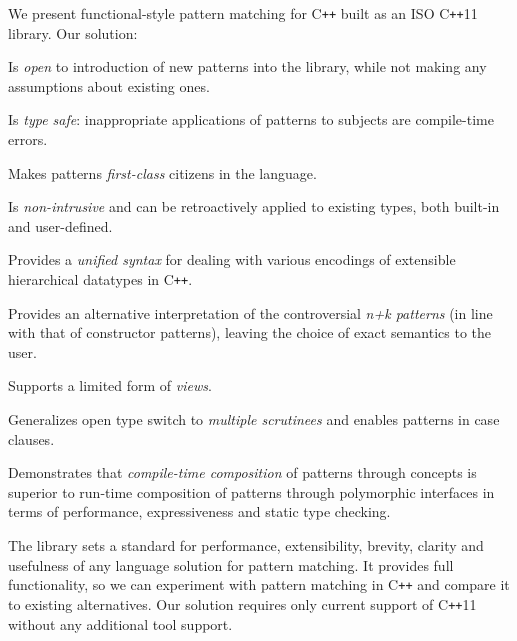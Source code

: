 \documentclass[10pt]{sigplanconf}
\DeclareRobustCommand{\Cpp}{C\texttt{++}}
\begin{document}
We present functional-style pattern matching for \Cpp{} built as an ISO 
\Cpp{}11 library. Our solution:

\begin{compactitem}
\setlength{\itemsep}{0pt}
\setlength{\parskip}{0pt}
  \item Is \emph{open} to introduction of new patterns into the library, while not 
        making any assumptions about existing ones.
  \item Is \emph{type safe}: inappropriate applications of patterns to subjects are compile-time errors.
  \item Makes patterns \emph{first-class} citizens in the language.
  \item Is \emph{non-intrusive} and can be retroactively applied to existing types, both built-in and user-defined.
  \item Provides a \emph{unified syntax} for dealing with various encodings of 
        extensible hierarchical datatypes in \Cpp{}.
  \item Provides an alternative interpretation of the controversial \emph{n+k 
        patterns} (in line with that of constructor patterns), leaving the choice 
        of exact semantics to the user.
  \item Supports a limited form of \emph{views}.
  \item Generalizes open type switch to \emph{multiple scrutinees} and enables patterns 
        in case clauses.
  \item Demonstrates that \emph{compile-time composition} of patterns through 
        concepts is superior to run-time composition of patterns through 
        polymorphic interfaces in terms of performance, expressiveness and 
        static type checking.
\end{compactitem}



\noindent
The library sets a standard for performance, extensibility, brevity, 
clarity and usefulness of any language solution for pattern matching.
It provides full functionality, so we can experiment with pattern matching in 
\Cpp{} and compare it to existing alternatives. Our solution requires only 
current support of \Cpp{}11 without any additional tool support.
\end{document}
